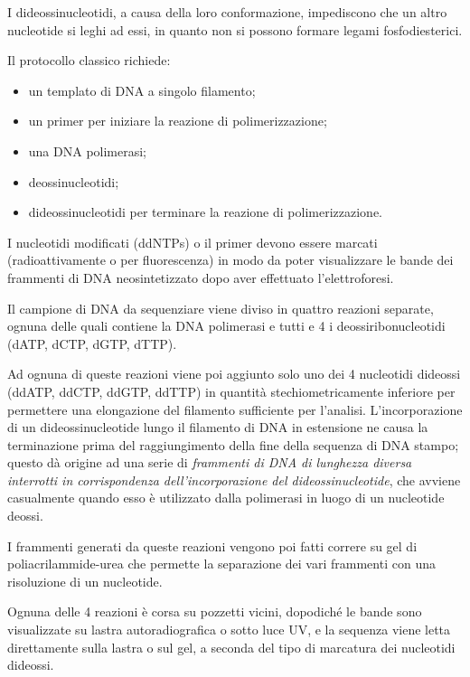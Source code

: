 \documentclass[11pt]{book}
\begin{document}
I dideossinucleotidi, a causa della loro conformazione, impediscono che
un altro nucleotide si leghi ad essi, in quanto non si possono formare
legami fosfodiesterici.

Il protocollo classico richiede:

\begin{itemize}
\itemsep1pt\parskip0pt
\item
  un templato di DNA a singolo filamento;
\item
  un primer per iniziare la reazione di polimerizzazione;
\item
  una DNA polimerasi;
\item
  deossinucleotidi;
\item
  dideossinucleotidi per terminare la reazione di polimerizzazione.
\end{itemize}

I nucleotidi modificati (ddNTPs) o il primer devono essere marcati
(radioattivamente o per fluorescenza) in modo da poter visualizzare le
bande dei frammenti di DNA neosintetizzato dopo aver effettuato
l'elettroforesi.

Il campione di DNA da sequenziare viene diviso in quattro reazioni
separate, ognuna delle quali contiene la DNA polimerasi e tutti e 4 i
deossiribonucleotidi (dATP, dCTP, dGTP, dTTP).

Ad ognuna di queste reazioni viene poi aggiunto solo uno dei 4
nucleotidi dideossi (ddATP, ddCTP, ddGTP, ddTTP) in quantità
stechiometricamente inferiore per permettere una elongazione del
filamento sufficiente per l'analisi. L'incorporazione di un
dideossinucleotide lungo il filamento di DNA in estensione ne causa la
terminazione prima del raggiungimento della fine della sequenza di DNA
stampo; questo dà origine ad una serie di \emph{frammenti di DNA di
lunghezza diversa interrotti in corrispondenza dell'incorporazione del
dideossinucleotide}, che avviene casualmente quando esso è utilizzato
dalla polimerasi in luogo di un nucleotide deossi.

I frammenti generati da queste reazioni vengono poi fatti correre su gel
di poliacrilammide-urea che permette la separazione dei vari frammenti
con una risoluzione di un nucleotide.

Ognuna delle 4 reazioni è corsa su pozzetti vicini, dopodiché le bande
sono visualizzate su lastra autoradiografica o sotto luce UV, e la
sequenza viene letta direttamente sulla lastra o sul gel, a seconda del
tipo di marcatura dei nucleotidi dideossi.
\end{document}
